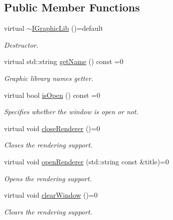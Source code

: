 \subsection*{Public Member Functions}
\begin{DoxyCompactItemize}
\item 
virtual \hyperlink{class_arcade_1_1_i_graphic_lib_a57fc39424aebb606cc64ee8d7e40afd5}{$\sim$\+I\+Graphic\+Lib} ()=default
\begin{DoxyCompactList}\small\item\em Destructor. \end{DoxyCompactList}\item 
virtual std\+::string \hyperlink{class_arcade_1_1_i_graphic_lib_aecc266c4ac10f07f4cdca023e74e843d}{get\+Name} () const =0
\begin{DoxyCompactList}\small\item\em Graphic library name\textquotesingle{}s getter. \end{DoxyCompactList}\item 
virtual bool \hyperlink{class_arcade_1_1_i_graphic_lib_adf9e107fbcfbd91e5a3daa9a2db76b4b}{is\+Open} () const =0
\begin{DoxyCompactList}\small\item\em Specifies whether the window is open or not. \end{DoxyCompactList}\item 
virtual void \hyperlink{class_arcade_1_1_i_graphic_lib_aa7c3c8b922fbc94f5e74ecfebad52742}{close\+Renderer} ()=0
\begin{DoxyCompactList}\small\item\em Closes the rendering support. \end{DoxyCompactList}\item 
virtual void \hyperlink{class_arcade_1_1_i_graphic_lib_a71f7f51bdd61b02377c4a9ec330eabb1}{open\+Renderer} (std\+::string const \&title)=0
\begin{DoxyCompactList}\small\item\em Opens the rendering support. \end{DoxyCompactList}\item 
\mbox{\label{class_arcade_1_1_i_graphic_lib_a24be73062bfc9bb79f7656568cc744d5}} 
virtual void \hyperlink{class_arcade_1_1_i_graphic_lib_a24be73062bfc9bb79f7656568cc744d5}{clear\+Window} ()=0
\begin{DoxyCompactList}\small\item\em Clears the rendering support. \end{DoxyCompactList}\item 

\end{DoxyCompactItemize}
